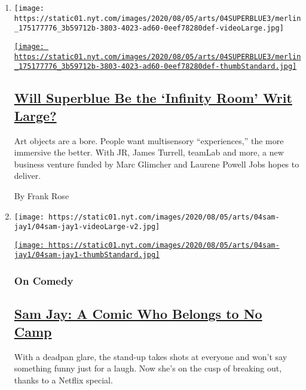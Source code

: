 \begin{enumerate}
\def\labelenumi{\arabic{enumi}.}
\item
  \texttt{[image: https://static01.nyt.com/images/2020/08/05/arts/04SUPERBLUE3/merlin\_175177776\_3b59712b-3803-4023-ad60-0eef78280def-videoLarge.jpg]}

  \href{/2020/08/04/arts/superblue-immersive-art-pace-jobs.html}{\texttt{[image: https://static01.nyt.com/images/2020/08/05/arts/04SUPERBLUE3/merlin\_175177776\_3b59712b-3803-4023-ad60-0eef78280def-thumbStandard.jpg]}}

  \hypertarget{will-superblue-be-the-infinity-room-writ-large}{%
  \subsection{\texorpdfstring{\href{/2020/08/04/arts/superblue-immersive-art-pace-jobs.html}{Will
  Superblue Be the `Infinity Room' Writ
  Large?}}{Will Superblue Be the `Infinity Room' Writ Large?}}\label{will-superblue-be-the-infinity-room-writ-large}}

  Art objects are a bore. People want multisensory ``experiences,'' the
  more immersive the better. With JR, James Turrell, teamLab and more, a
  new business venture funded by Marc Glimcher and Laurene Powell Jobs
  hopes to deliver.

  By Frank Rose
\item
  \texttt{[image: https://static01.nyt.com/images/2020/08/05/arts/04sam-jay1/04sam-jay1-videoLarge-v2.jpg]}

  \href{/2020/08/04/arts/television/sam-jay-netflix-special.html}{\texttt{[image: https://static01.nyt.com/images/2020/08/05/arts/04sam-jay1/04sam-jay1-thumbStandard.jpg]}}

  \hypertarget{on-comedy}{%
  \subsubsection{On Comedy}\label{on-comedy}}

  \hypertarget{sam-jay-a-comic-who-belongs-to-no-camp}{%
  \subsection{\texorpdfstring{\href{/2020/08/04/arts/television/sam-jay-netflix-special.html}{Sam
  Jay: A Comic Who Belongs to No
  Camp}}{Sam Jay: A Comic Who Belongs to No Camp}}\label{sam-jay-a-comic-who-belongs-to-no-camp}}

  With a deadpan glare, the stand-up takes shots at everyone and won't
  say something funny just for a laugh. Now she's on the cusp of
  breaking out, thanks to a Netflix special.


\end{enumerate}
